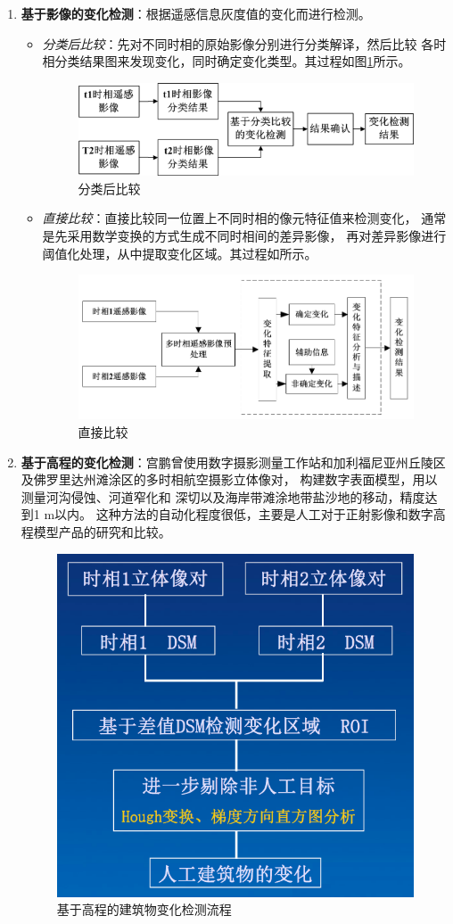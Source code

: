 \begin{enumerate}
	\item \textbf{基于影像的变化检测}：根据遥感信息灰度值的变化而进行检测。
		\begin{itemize}
			\item \textit{分类后比较}：先对不同时相的原始影像分别进行分类解译，然后比较
				各时相分类结果图来发现变化，同时确定变化类型。其过程如图\ref{fig:分类后比较}所示。
				\begin{figure}[htbp]
					\centering
					\includegraphics[width=0.5\linewidth]{figure/Chapter6/分类后比较}
					\caption{分类后比较}
					\label{fig:分类后比较}
				\end{figure}
			\item \textit{直接比较}：直接比较同一位置上不同时相的像元特征值来检测变化，
				通常是先采用数学变换的方式生成不同时相间的差异影像，
				再对差异影像进行阈值化处理，从中提取变化区域。其过程如所示。
				\begin{figure}[htbp]
					\centering
					\includegraphics[width=0.5\linewidth]{figure/Chapter6/直接比较}
					\caption{直接比较}
					\label{fig:直接比较}
				\end{figure}
		\end{itemize}
	\item \textbf{基于高程的变化检测}：宫鹏曾使用数字摄影测量工作站和加利福尼亚州丘陵区及佛罗里达州滩涂区的多时相航空摄影立体像对， 构建数字表面模型，用以测量河沟侵蚀、河道窄化和 深切以及海岸带滩涂地带盐沙地的移动，精度达到1 m以内。
		这种方法的自动化程度很低，主要是人工对于正射影像和数字高程模型产品的研究和比较。
		\begin{figure}[htbp]
			\centering
			\includegraphics[width=0.5\linewidth]{figure/Chapter6/基于高程的建筑物变化检测流程}
			\caption{基于高程的建筑物变化检测流程}
			\label{fig:基于高程的建筑物变化检测流程}
		\end{figure}
\end{enumerate}

